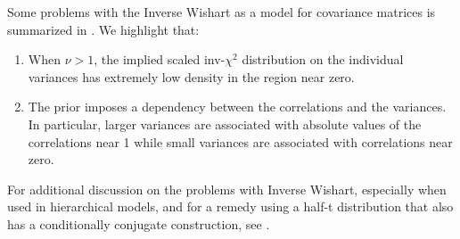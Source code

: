 \documentclass{article} %
\begin{document}
Some problems with the Inverse Wishart as a model for covariance matrices is summarized in  \cite{alvarez2014bayesian}.    We highlight that:
\begin{enumerate}
\item  When $\nu  > 1$,   the implied scaled inv-$\chi^2$ distribution on the individual variances has extremely low density in the region near zero.   
\item The prior imposes a dependency between the correlations and the variances. In particular,  larger variances are associated with absolute values of the correlations near 1 while small variances
are associated with correlations near zero.    
\end{enumerate}
For additional discussion on the problems with Inverse Wishart,  especially when used in hierarchical models,  and for a remedy using a half-t distribution that also has a conditionally conjugate construction,  see \cite{wojnowiczXXXXcategorical}.



{}

\end{document}
